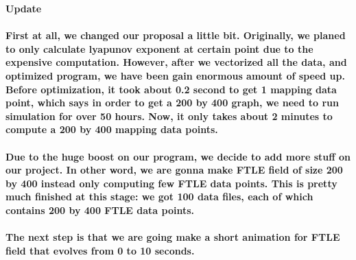 \documentclass[12pt]{article}
\begin{document}
\begin{center}
\textbf{\LARGE Update}
\end{center}

\paragraph{
\indent First at all, we changed our proposal a little bit. Originally, we planed to only calculate lyapunov exponent at certain point due to the expensive computation. However, after we vectorized all the data, and optimized program, we have been gain enormous amount of speed up. Before optimization, it took about 0.2 second to get 1 mapping data point, which says in order to get a 200 by 400 graph, we need to run simulation for over 50 hours. Now, it only takes about 2 minutes to compute a 200 by 400 mapping data points.\\
}

\paragraph{
\indent Due to the huge boost on our program, we decide to add more stuff on our project. In other word, we are gonna make FTLE field of size 200 by 400 instead only computing few FTLE data points. This is pretty much finished at this stage: we got 100 data files, each of which contains 200 by 400 FTLE data points.\\
}
\paragraph{
\indent The next step is that we are going make a short animation for FTLE field that evolves from 0 to 10 seconds.\\
}
\end{document}
